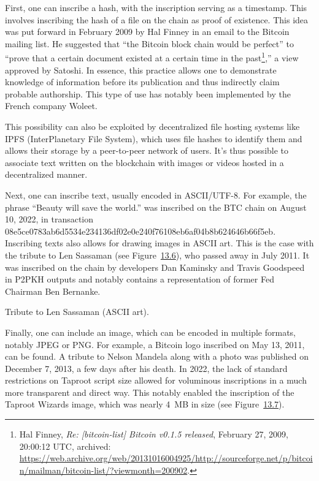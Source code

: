 \documentclass[
  a5paper,
  smalldemyvopaper,10pt,twoside,onecolumn,openright,extrafontsizes,hidelinks]{memoir}
\begin{document}
First, one can inscribe a hash, with the inscription serving as a
timestamp. This involves inscribing the hash of a file on the chain as
proof of existence. This idea was put forward in February 2009 by Hal
Finney in an email to the Bitcoin mailing list. He suggested that ``the
Bitcoin block chain would be perfect'' to ``prove that a certain
document existed at a certain time in the past\footnote{Hal Finney,
  \emph{Re: {[}bitcoin-list{]} Bitcoin v0.1.5 released}, February 27,
  2009, 20:00:12 UTC, archived:
  \url{https://web.archive.org/web/20131016004925/http://sourceforge.net/p/bitcoin/mailman/bitcoin-list/?viewmonth=200902}.},''
a view approved by Satoshi. In essence, this practice allows one to
demonstrate knowledge of information before its publication and thus
indirectly claim probable authorship. This type of use has notably been
implemented by the French company Woleet.

This possibility can also be exploited by decentralized file hosting
systems like IPFS (InterPlanetary File System), which uses file hashes
to identify them and allows their storage by a peer-to-peer network of
users. It's thus possible to associate text written on the blockchain
with images or videos hosted in a decentralized manner.

Next, one can inscribe text, usually encoded in ASCII/UTF-8. For
example, the phrase ``Beauty will save the world.'' was inscribed on the
BTC chain on August 10, 2022, in transaction
08e5ce0783ab6d5534e234136df02e0e240f76108eb6af04b8b624646b66f5eb.
Inscribing texts also allows for drawing images in ASCII art. This is
the case with the tribute to Len Sassaman (see
Figure~\hyperref[fig:sassaman-tribute]{13.6}), who passed away in July
2011. It was inscribed on the chain by developers Dan Kaminsky and
Travis Goodspeed in P2PKH outputs and notably contains a representation
of former Fed Chairman Ben Bernanke.

Tribute to Len Sassaman (ASCII art).

Finally, one can include an image, which can be encoded in multiple
formats, notably JPEG or PNG. For example, a Bitcoin logo inscribed on
May 13, 2011, can be found. A tribute to Nelson Mandela along with a
photo was published on December 7, 2013, a few days after his death. In
2022, the lack of standard restrictions on Taproot script size allowed
for voluminous inscriptions in a much more transparent and direct way.
This notably enabled the inscription of the Taproot Wizards image, which
was nearly 4~MB in size (see
Figure~\hyperref[fig:taproot-wizards]{13.7}).
\end{document}
